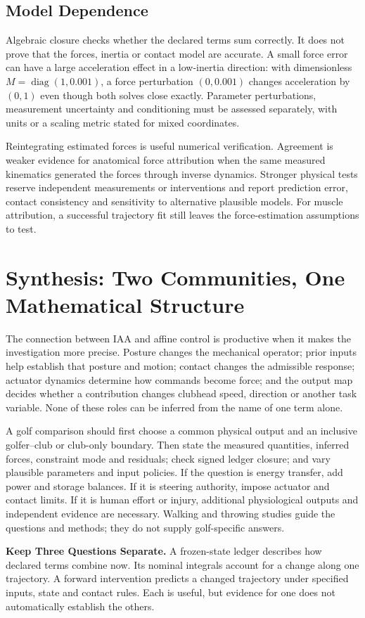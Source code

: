 \subsection{Model Dependence}

Algebraic closure checks whether the declared terms sum correctly. It does not prove that the forces, inertia or contact model are accurate. A small force error can have a large acceleration effect in a low-inertia direction: with dimensionless $M=\operatorname{diag}(1,0.001)$, a force perturbation $(0,0.001)$ changes acceleration by $(0,1)$ even though both solves close exactly. Parameter perturbations, measurement uncertainty and conditioning must be assessed separately, with units or a scaling metric stated for mixed coordinates.

Reintegrating estimated forces is useful numerical verification. Agreement is weaker evidence for anatomical force attribution when the same measured kinematics generated the forces through inverse dynamics. Stronger physical tests reserve independent measurements or interventions and report prediction error, contact consistency and sensitivity to alternative plausible models. For muscle attribution, a successful trajectory fit still leaves the force-estimation assumptions to test.

\section{Synthesis: Two Communities, One Mathematical Structure}
\label{sec:iaa_synthesis}

The connection between IAA and affine control is productive when it makes the investigation more precise. Posture changes the mechanical operator; prior inputs help establish that posture and motion; contact changes the admissible response; actuator dynamics determine how commands become force; and the output map decides whether a contribution changes clubhead speed, direction or another task variable. None of these roles can be inferred from the name of one term alone.

A golf comparison should first choose a common physical output and an inclusive golfer--club or club-only boundary. Then state the measured quantities, inferred forces, constraint mode and residuals; check signed ledger closure; and vary plausible parameters and input policies. If the question is energy transfer, add power and storage balances. If it is steering authority, impose actuator and contact limits. If it is human effort or injury, additional physiological outputs and independent evidence are necessary. Walking and throwing studies guide the questions and methods; they do not supply golf-specific answers.

\begin{warningbox}
\textbf{Keep Three Questions Separate.} A frozen-state ledger describes how declared terms combine now. Its nominal integrals account for a change along one trajectory. A forward intervention predicts a changed trajectory under specified inputs, state and contact rules. Each is useful, but evidence for one does not automatically establish the others.
\end{warningbox}
